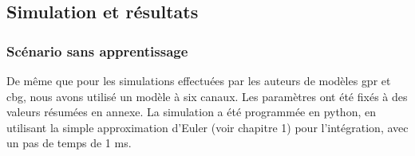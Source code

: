 \subsection{Simulation et résultats}

\subsubsection{Scénario sans apprentissage}

De même que pour les simulations effectuées par les auteurs de modèles \gls{gpr} et \gls{cbg}, nous avons utilisé un modèle à six canaux. Les paramètres ont été fixés à des valeurs résumées en annexe. La simulation a été programmée en python, en utilisant la simple approximation d'Euler (voir chapitre 1) pour l'intégration, avec un pas de temps de 1 ms. \\

